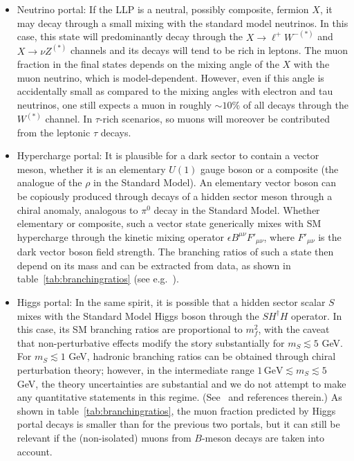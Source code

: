 \begin{itemize}
\item Neutrino portal: If the LLP is a neutral, possibly composite, fermion $X$, it may decay through a small mixing with the standard model neutrinos. In this case, this state will predominantly decay through the $X\to \ell^+ W^{-(\ast)}$ and $X\to \nu Z^{(\ast)}$ channels and its decays will tend to be rich in leptons. The muon fraction in the final states depends on the mixing angle of the $X$ with the muon neutrino, which is model-dependent. However, even if this angle is accidentally small as compared to the mixing angles with electron and tau neutrinos, one still expects a muon in roughly $\sim10\%$ of all decays through the $W^{(\ast)}$ channel. In $\tau$-rich scenarios, so muons will moreover be contributed from the leptonic $\tau$ decays.

\item Hypercharge portal: It is plausible for a dark sector to contain a vector meson, whether it is an elementary $U(1)$ gauge boson or a composite (the analogue of the $\rho$ in the Standard Model). An elementary vector boson can be  copiously produced through decays of a hidden sector meson through a chiral anomaly, analogous to $\pi^0$ decay in the Standard Model.  Whether elementary or composite, such a vector state generically mixes with SM hypercharge through the kinetic mixing operator $\epsilon B^{\mu\nu}F'_{\mu\nu}$, where $F'_{\mu\nu}$ is the dark vector boson field strength.  The branching ratios of such a state then depend on its mass and can be extracted from data, as shown in table~\ref{tab:branchingratios} (see e.g.~\cite{Meade:2009rb, Curtin:2014cca}).

\item Higgs portal: In the same spirit, it is possible that a hidden sector scalar $S$ mixes with the Standard Model Higgs boson through the $S H^\dagger H$ operator. In this case, its SM branching ratios are proportional to $m_f^2$, with the caveat that non-perturbative effects modify the story substantially for $m_S\lesssim 5$ GeV. For $m_S\lesssim 1$ GeV, hadronic branching ratios can be obtained through chiral perturbation theory; however, in the intermediate range  $1\, \mathrm{GeV} \lesssim m_S \lesssim 5$ GeV, the theory uncertainties are substantial and we do not attempt to make any quantitative statements in this regime. (See~\cite{Clarke:2013aya} and references therein.) As shown in table~\ref{tab:branchingratios}, the muon fraction predicted by Higgs portal decays is smaller than for the previous two portals, but it can still be relevant if the (non-isolated) muons from $B$-meson decays are taken into account.


\end{itemize}
